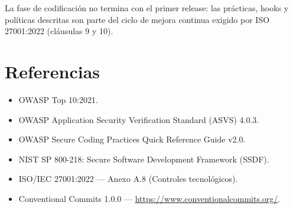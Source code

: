 \documentclass[12pt,a4paper,oneside]{article}
\begin{document}
La fase de codificación no termina con el primer release: las prácticas, hooks y políticas descritas son parte del ciclo de mejora continua exigido por ISO 27001:2022 (cláusulas 9 y 10).

\section*{Referencias}
\begin{itemize}[leftmargin=*]
  \item OWASP Top 10:2021.
  \item OWASP Application Security Verification Standard (ASVS) 4.0.3.
  \item OWASP Secure Coding Practices Quick Reference Guide v2.0.
  \item NIST SP 800-218: Secure Software Development Framework (SSDF).
  \item ISO/IEC 27001:2022 — Anexo A.8 (Controles tecnológicos).
  \item Conventional Commits 1.0.0 — \url{https://www.conventionalcommits.org/}.
\end{itemize}
\end{document}
